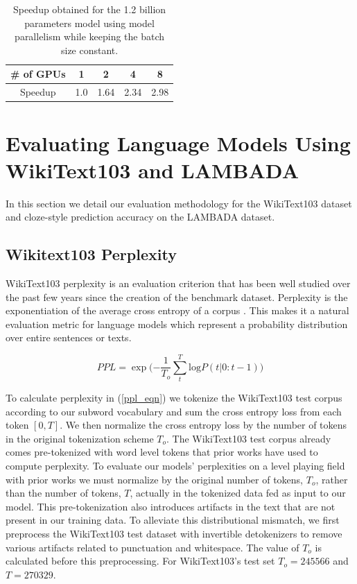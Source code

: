 \begin{table}
\centering
\caption{Speedup obtained for the 1.2 billion parameters model using model parallelism while keeping the batch size constant.}
\vskip 0.15in
\begin{tabular}{c|c|c|c|c}
\hline \hline
\# of GPUs & 1 & 2 & 4 & 8 \\
\hline
Speedup & 1.0 & 1.64 & 2.34 & 2.98 \\
\hline \hline
\end{tabular}
\label{tab:strong_scaling}
\vskip -0.1in
\end{table}




\section{Evaluating Language Models Using WikiText103 and LAMBADA}
\label{app:wikilambada}
In this section we detail our evaluation methodology for the WikiText103 dataset \citep{wikitext} and cloze-style prediction accuracy on the LAMBADA dataset\citep{lambada}.

\subsection{Wikitext103 Perplexity}
WikiText103 perplexity is an evaluation criterion that has been well studied over the past few years since the creation of the benchmark dataset. Perplexity is the exponentiation of the average cross entropy of a corpus \citep{perplexity}. This makes it a natural evaluation metric for language models which represent a probability distribution over entire sentences or texts. 

\begin{equation}
 PPL= \exp({-\frac{1}{T_o}\sum_{t}^{T} \text{log} P(t|0:t-1))}
 \label{ppl_eqn}
\end{equation}

To calculate perplexity in (\ref{ppl_eqn}) we tokenize the WikiText103 test corpus according to our subword vocabulary and sum the cross entropy loss from each token $[0, T]$. We then normalize the cross entropy loss by the number of tokens in the original tokenization scheme $T_o$. The WikiText103 test corpus already comes pre-tokenized with word level tokens that prior works have used to compute perplexity. To evaluate our models' perplexities on a level playing field with prior works we must normalize by the original number of tokens, $T_o$, rather than the number of tokens, $T$, actually in the tokenized data fed as input to our model.  This pre-tokenization also introduces artifacts in the text that are not present in our training data. To alleviate this distributional mismatch, we first preprocess the WikiText103 test dataset with invertible detokenizers to remove various artifacts related to punctuation and whitespace. The value of $T_o$ is calculated before this preprocessing. For WikiText103's test set $T_o=245566$ and $T=270329$.

